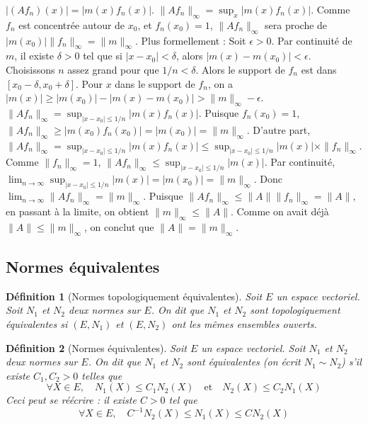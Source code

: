\documentclass{article}
\newtheorem{definition}{Définition} %
\theoremstyle{definition} %
\begin{document}
$|(Af_n)(x)| = |m(x) f_n(x)|$.
$\|Af_n\|_\infty = \sup_x |m(x) f_n(x)|$.
Comme $f_n$ est concentrée autour de $x_0$, et $f_n(x_0)=1$, $\|Af_n\|_\infty$ sera proche de $|m(x_0)| \|f_n\|_\infty = \|m\|_\infty$.
Plus formellement :
Soit $\epsilon > 0$. Par continuité de $m$, il existe $\delta > 0$ tel que si $|x-x_0| < \delta$, alors $|m(x) - m(x_0)| < \epsilon$.
Choisissons $n$ assez grand pour que $1/n < \delta$. Alors le support de $f_n$ est dans $[x_0 - \delta, x_0 + \delta]$.
Pour $x$ dans le support de $f_n$, on a $|m(x)| \ge |m(x_0)| - |m(x) - m(x_0)| > \|m\|_\infty - \epsilon$.
$\|Af_n\|_\infty = \sup_{|x-x_0|\le 1/n} |m(x) f_n(x)|$.
Puisque $f_n(x_0)=1$, $\|Af_n\|_\infty \ge |m(x_0)f_n(x_0)| = |m(x_0)| = \|m\|_\infty$.
D'autre part, $\|Af_n\|_\infty = \sup_{|x-x_0|\le 1/n} |m(x) f_n(x)| \le \sup_{|x-x_0|\le 1/n} |m(x)| \times \|f_n\|_\infty$.
Comme $\|f_n\|_\infty = 1$, $\|Af_n\|_\infty \le \sup_{|x-x_0|\le 1/n} |m(x)|$.
Par continuité, $\lim_{n\to\infty} \sup_{|x-x_0|\le 1/n} |m(x)| = |m(x_0)| = \|m\|_\infty$.
Donc $\lim_{n\to\infty} \|Af_n\|_\infty = \|m\|_\infty$.
Puisque $\|Af_n\|_\infty \le \|A\| \|f_n\|_\infty = \|A\|$, en passant à la limite, on obtient $\|m\|_\infty \le \|A\|$.
Comme on avait déjà $\|A\| \le \|m\|_\infty$, on conclut que $\|A\| = \|m\|_\infty$.

\subsection{Normes équivalentes}

\begin{definition}[Normes topologiquement équivalentes]
Soit $E$ un espace vectoriel. Soit $N_1$ et $N_2$ deux normes sur $E$.
On dit que $N_1$ et $N_2$ sont topologiquement équivalentes si $(E, N_1)$ et $(E, N_2)$ ont les mêmes ensembles ouverts.
\end{definition}

\begin{definition}[Normes équivalentes]
Soit $E$ un espace vectoriel. Soit $N_1$ et $N_2$ deux normes sur $E$.
On dit que $N_1$ et $N_2$ sont équivalentes (on écrit $N_1 \sim N_2$) s'il existe $C_1, C_2 > 0$ telles que
    \[ \forall X \in E, \quad N_1(X) \le C_1 N_2(X) \quad \text{et} \quad N_2(X) \le C_2 N_1(X) \]
    Ceci peut se réécrire : il existe $C > 0$ tel que
    \[ \forall X \in E, \quad C^{-1} N_2(X) \le N_1(X) \le C N_2(X) \]
\end{definition}
\end{document}
